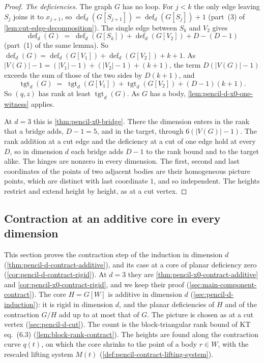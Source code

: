 \begin{proof}
  \emph{The deficiencies.} The graph $G$ has no loop. For $j < k$ the only
  edge leaving $S_j$ joins it to $x_{j+1}$, so
  $\operatorname{def}_d(G[S_{j+1}]) = \operatorname{def}_d(G[S_j]) + 1$
  (part~(3) of \cref{lem:cut-edge-decomposition}). The single edge between
  $S_k$ and $V_2$ gives
  \[
    \operatorname{def}_d(G) \;=\; \operatorname{def}_d(G[S_k])
    + \operatorname{def}_d(G[V_2]) + D - (D - 1)
  \]
  (part~(1) of the same lemma). So
  $\operatorname{def}_d(G) = \operatorname{def}_d(G[V_1]) +
  \operatorname{def}_d(G[V_2]) + k + 1$. As
  $|V(G)| - 1 = (|V_1| - 1) + (|V_2| - 1) + (k + 1)$, the term
  $D(|V(G)| - 1)$ exceeds the sum of those of the two sides by $D(k + 1)$,
  and
  \[
    \operatorname{tgt}_d(G) \;=\; \operatorname{tgt}_d(G[V_1]) +
    \operatorname{tgt}_d(G[V_2]) + (D - 1)(k + 1).
  \]
  So $(q, z)$ has rank at least $\operatorname{tgt}_d(G)$. As $G$ has a
  body, \cref{lem:pencil-d-x0-one-witness} applies.

  At $d = 3$ this is \cref{thm:pencil-x0-bridge}. There the dimension
  enters in the rank that a bridge adds, $D - 1 = 5$, and in the target,
  through $6(|V(G)| - 1)$. The rank addition at a cut edge and the
  deficiency at a cut of one edge hold at every $D$, so in dimension $d$
  each bridge adds $D - 1$ to the rank bound and to the target alike. The
  hinges are nonzero in every dimension. The first, second and last
  coordinates of the points of two adjacent bodies are their homogeneous
  picture points, which are distinct with last coordinate $1$, and so
  independent. The heights restrict and extend height by height, as at a
  cut vertex.
\end{proof}

\subsection{Contraction at an additive core in every dimension}
\label{sec:pencil-d-contract}

This section proves the contraction step of the induction in dimension
$d$ (\cref{thm:pencil-d-contract-additive}), and its case at a core of
planar deficiency zero (\cref{cor:pencil-d-contract-rigid}). At $d = 3$
they are \cref{thm:pencil-x0-contract-additive} and
\cref{cor:pencil-x0-contract-rigid}, and we keep their proof
(\cref{sec:main-component-contract}). The core $H = G[W]$ is additive in
dimension $d$ (\cref{sec:pencil-d-induction}): it is rigid in dimension
$d$, and the planar deficiencies of $H$ and of the contraction $G/H$ add
up to at most that of $G$. The picture is chosen as at a cut vertex
(\cref{sec:pencil-d-cut}). The count is the block-triangular rank bound
of KT eq.~(6.3) (\cref{lem:block-rank-contract}). The heights are
found along the contraction curve $q(t)$, on which the core shrinks to
the point of a body $r \in W$, with the rescaled lifting system $M(t)$
(\cref{def:pencil-contract-lifting-system}).

